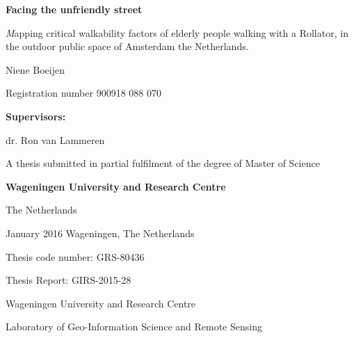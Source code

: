 \documentclass[10pt,a4paper, titlepage, onecolumn, openright, oneside, fleqn]{scrreprt}  %
\begin{document}
	\begin{titlepage}
		\begin{center}
			\LARGE \textbf{Facing the unfriendly street}
			\vspace*{0.5cm}
			
			\Large\textit Mapping critical walkability factors of elderly people walking with a Rollator, in the outdoor public space of Amsterdam the Netherlands. \par
			
			\vspace*{1.5cm}
			
			Niene Boeijen
			
			Registration number 900918 088 070
			
			\vspace*{1.5cm}
			
			\textbf{Supervisors:}
			
			dr. Ron van Lammeren
			
			\vspace*{1.5cm}
			
			A thesis submitted in partial fulfilment of the degree of Master of Science
			
			\textbf{Wageningen University and Research Centre }
			
			The Netherlands
		\end{center}
		
		\vfill
		
		\begin{flushright}
			January 2016
			Wageningen, The Netherlands
		\end{flushright}
		
		\begin{flushleft}
					Thesis code number: GRS-80436
					
					Thesis Report: GIRS-2015-28			
					
					Wageningen University and Research Centre
					
					Laboratory of Geo-Information Science and Remote Sensing
		\end{flushleft}
		
	\end{titlepage}

	\cleardoubleemptypage


	\tableofcontents
	\listoffigures 
	\listoftables 
	 


	 
	 
	 
	
	
	
	
	
	 

	{}
	
	
	\appendix
	
\end{document}

